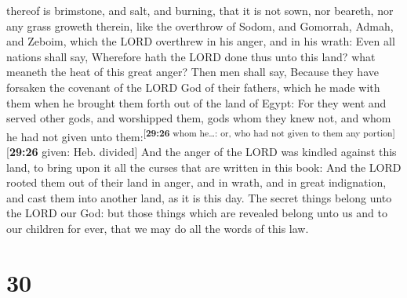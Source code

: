 thereof is brimstone, and salt, and burning, that it is not sown, nor
beareth, nor any grass groweth therein, like the overthrow of Sodom, and
Gomorrah, Admah, and Zeboim, which the LORD overthrew in his anger, and
in his wrath:  Even all nations shall say, Wherefore hath
the LORD done thus unto this land? what meaneth the heat of this great
anger?  Then men shall say, Because they have forsaken
the covenant of the LORD God of their fathers, which he made with them
when he brought them forth out of the land of Egypt:  For
they went and served other gods, and worshipped them, gods whom they
knew not, and whom he had not given unto
them:\textsuperscript{{[}\textbf{29:26} whom he\ldots: or, who had not
given to them any portion{]}}{[}\textbf{29:26} given: Heb. divided{]}
 And the anger of the LORD was kindled against this land,
to bring upon it all the curses that are written in this book:
 And the LORD rooted them out of their land in anger, and
in wrath, and in great indignation, and cast them into another land, as
it is this day.  The secret things belong unto the LORD
our God: but those things which are revealed belong unto us and to our
children for ever, that we may do all the words of this law.

\hypertarget{section-29}{%
\section{30}\label{section-29}}

